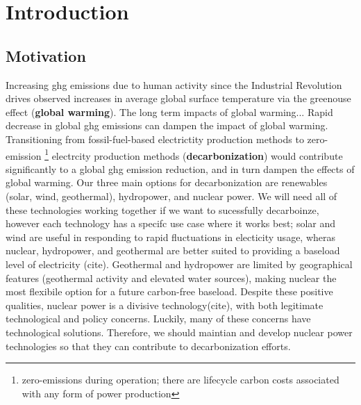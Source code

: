 \chapter{Introduction}%
\label{cha:introduction}

\section{Motivation}%
\label{sec:motivation}

Increasing \Gls{ghg} emissions due to human activity since the Industrial Revolution drives observed increases in average global surface temperature via the greenouse effect\cite{mitchell_greenhouse_1989} \cite{paola_a_arias_2021_ts} (\textbf{global warming}).
The long term impacts of global warming...
Rapid decrease in global \Gls{ghg} emissions can dampen the impact of global warming. Transitioning from fossil-fuel-based electrictity production methods to zero-emission \footnote{zero-emissions during operation; there are lifecycle carbon costs associated with any form of power production} electrcity production methods (\textbf{decarbonization}) would contribute significantly to a global \Gls{ghg} emission reduction, and in turn dampen the effects of global
warming. Our three main options for decarbonization are renewables (solar, wind, geothermal), hydropower, and nuclear power. We will need all of these technologies working together if we want to sucessfully decarboinze, however each technology has a specifc use case where it works best; solar and wind are useful in responding to rapid fluctuations in electicity usage, wheras nuclear, hydropower, and geothermal are better suited to
providing a baseload level of electricity (cite). Geothermal and hydropower are limited by geographical features (geothermal activity and elevated water sources), making nuclear the most flexibile option for a future carbon-free baseload. Despite these positive qualities, nuclear power is a divisive technology(cite), with both legitimate technological and policy concerns.%
Luckily, many of these concerns have technological solutions. Therefore, we should maintian and develop nuclear power technologies so that they can contribute to decarbonization efforts.

